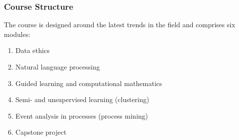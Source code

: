 \documentclass[
    NAME={Dr. Helga Ingimundardóttir},
    EMAIL={helgaingim@hi.is},
    FACULTY={Industrial Engineering},
    TITLE={Business Intelligence},
    SUBTITLE={Introduction},
    SEMINAR={IÐN610M},
    DATE={Spring, 2024}
]{HI-LaTeX/hi-beamer}
\begin{document}
    \begin{frame}
        \frametitle{Course Structure}
        The course is designed around the \alert{latest trends} in the field and comprises six modules:
        \begin{enumerate}
            \item Data ethics
            \item Natural language processing
            \item Guided learning and computational mathematics
            \item Semi- and unsupervised learning (clustering)
            \item Event analysis in processes (process mining)
            \item Capstone project
        \end{enumerate}
    \end{frame}
\end{document}
